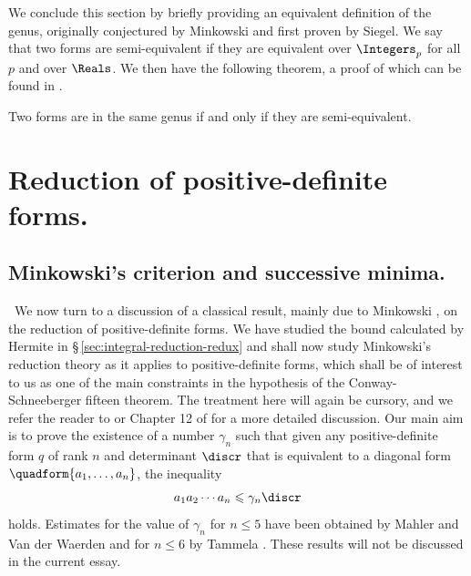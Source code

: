 \medskip

We conclude this section by briefly providing an equivalent definition of the
genus, originally conjectured by Minkowski and first proven by Siegel. We say
that two forms are semi-equivalent if they are equivalent over \(\Integers_p\)
for all \(p\) and over \(\Reals\). We then have the following theorem, a proof
of which can be found in \cite[\S\,5]{siegel1941equivalence}.

\begin{theoremx}
    Two forms are in the same genus if and only if they are semi-equivalent.
\end{theoremx}

\section{Reduction of positive-definite forms.}

\subsection{Minkowski's criterion and successive minima.}~We now turn to a
discussion of a classical result, mainly due to Minkowski
\cite{schwermer2007reduction,minkowski1885untersuchungen}, on the reduction of
positive-definite forms. We have studied the bound calculated by Hermite in
\S\,\ref{sec:integral-reduction-redux} and shall now study Minkowski's reduction
theory as it applies to positive-definite forms, which shall be of interest to
us as one of the main constraints in the hypothesis of the Conway-Schneeberger
fifteen theorem. The treatment here will again be cursory, and we refer the
reader to \cite{donaldson1979minkowski} or Chapter 12 of
\cite{cassels2008rational} for a more detailed discussion. Our main aim is to
prove the existence of a number \(\gamma_n\) such that given any
positive-definite form \(q\) of rank \(n\) and determinant \(\discr\) that is
equivalent to a diagonal form \(\quadform{a_1, \dots, a_n}\), the inequality
\[
    a_1 a_2 \cdots a_n \leq \gamma_n \discr
\]
holds. Estimates for the value of \(\gamma_n\) for \(n \leq 5\) have been
obtained by Mahler \cite{mahler1938minkowski} and Van der Waerden
\cite{van1956reduktionstheorie,van1969dasminimum} and for \(n \leq 6\) by
Tammela \cite{tammela1979reduction}. These results will not be discussed in the
current essay.\label{sec:minkowski-criterion}

